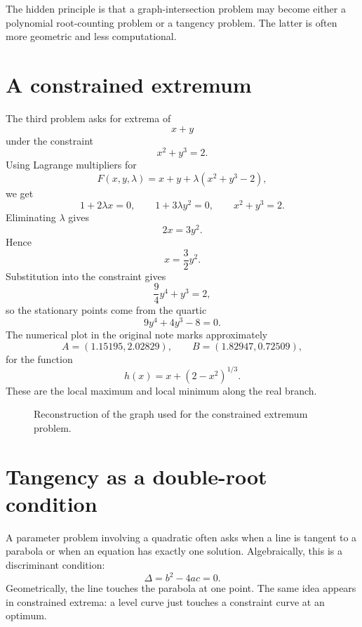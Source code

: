 \begin{remark}
The hidden principle is that a graph-intersection problem may become either a polynomial root-counting problem or a tangency problem.  The latter is often more geometric and less computational.
\end{remark}

\section{A constrained extremum}

The third problem asks for extrema of
\[
  x+y
\]
under the constraint
\[
  x^2+y^3=2.
\]
Using Lagrange multipliers for
\[
  F(x,y,\lambda)=x+y+\lambda(x^2+y^3-2),
\]
we get
\[
  1+2\lambda x=0,\qquad
  1+3\lambda y^2=0,\qquad
  x^2+y^3=2.
\]
Eliminating \(\lambda\) gives
\[
  2x=3y^2.
\]
Hence
\[
  x=\frac32y^2.
\]
Substitution into the constraint gives
\[
  \frac94y^4+y^3=2,
\]
so the stationary points come from the quartic
\[
  9y^4+4y^3-8=0.
\]
The numerical plot in the original note marks approximately
\[
  A=(1.15195,2.02829),\qquad B=(1.82947,0.72509),
\]
for the function
\[
  h(x)=x+(2-x^2)^{1/3}.
\]
These are the local maximum and local minimum along the real branch.

\begin{figure}[H]
\centering
{}
\caption{Reconstruction of the graph used for the constrained extremum problem.}
\end{figure}


\section{Tangency as a double-root condition}

A parameter problem involving a quadratic often asks when a line is tangent to a parabola or when an equation has exactly one solution.  Algebraically, this is a discriminant condition:
\[
  \Delta=b^2-4ac=0.
\]
Geometrically, the line touches the parabola at one point.  The same idea appears in constrained extrema: a level curve just touches a constraint curve at an optimum.

